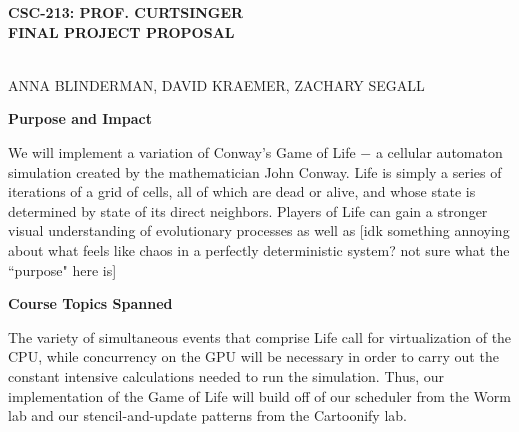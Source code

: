 \documentclass[12pt]{article}
\begin{document}


\newcommand{\ttspc}{\hspace{1mm}}
\newcommand{\tspc}{\hspace{2mm}}
\newcommand{\lspc}{\hspace{10mm}}
\newcommand{\ttc}{, \ttspc}
\newcommand{\fnt}{\fontfamily{qcr}\selectfont}
\newcommand{\mybegit}{\vspace{-1.5mm} \begin{itemize} \itemsep-.5em }


\begin{center}
\begin{Large} \textbf{CSC-213: PROF. CURTSINGER} \\
\vspace{3mm} \textbf{FINAL PROJECT PROPOSAL} \end{Large} \\
\vspace{5mm} ANNA BLINDERMAN, DAVID KRAEMER, ZACHARY SEGALL
\end{center} 





\vspace{12mm} \textbf{Purpose and Impact}


\vspace{2mm} \hspace{10mm} We will implement a variation of Conway's Game of Life $-$ a cellular automaton simulation created by the mathematician John Conway. Life is simply a series of iterations of a grid of cells, all of which are dead or alive, and whose state is determined by state of its direct neighbors. Players of Life can gain a stronger visual understanding of evolutionary processes as well as [idk something annoying about what feels like chaos in a perfectly deterministic system? not sure what the ``purpose" here is]




\vspace{12mm} \textbf{Course Topics Spanned}


\vspace{2mm} \hspace{10mm} The variety of simultaneous events that comprise Life call for virtualization of the CPU, while concurrency on the GPU will be necessary in order to carry out the constant intensive calculations needed to run the simulation. Thus, our implementation of the Game of Life will build off of our scheduler from the Worm lab and our stencil-and-update patterns from the Cartoonify lab.
\end{document}
